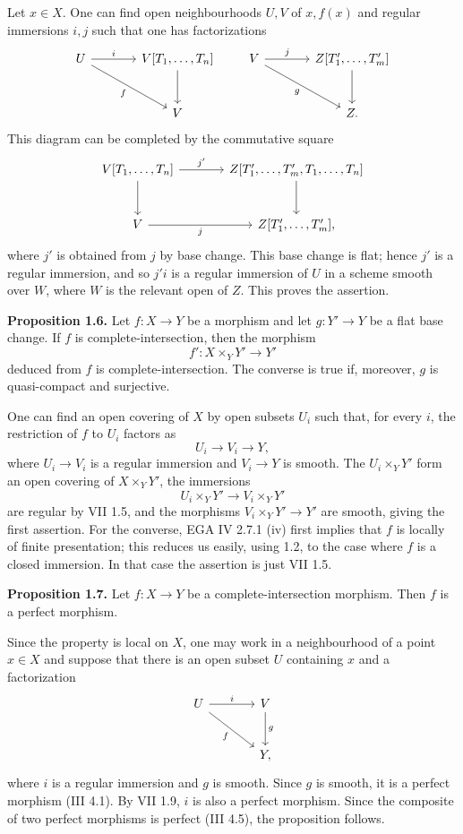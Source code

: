 \documentclass[11pt]{article}
\begin{document}
Let $x\in X$. One can find open neighbourhoods $U,V$ of $x,f(x)$ and regular immersions $i,j$ such that one has factorizations
\[
\begin{tikzcd}[column sep=large,row sep=large]
U \arrow[r,"i"] \arrow[dr,"f"'] & V[T_1,\ldots,T_n] \arrow[d]\\
& V
\end{tikzcd}
\qquad
\begin{tikzcd}[column sep=large,row sep=large]
V \arrow[r,"j"] \arrow[dr,"g"'] & Z[T'_1,\ldots,T'_m] \arrow[d]\\
& Z.
\end{tikzcd}
\]
This diagram can be completed by the commutative square
\[
\begin{tikzcd}[column sep=large,row sep=large]
V[T_1,\ldots,T_n] \arrow[r,"j'"] \arrow[d] & Z[T'_1,\ldots,T'_m,T_1,\ldots,T_n] \arrow[d]\\
V \arrow[r,"j"'] & Z[T'_1,\ldots,T'_m],
\end{tikzcd}
\]
where $j'$ is obtained from $j$ by base change. This base change is flat; hence $j'$ is a regular immersion, and so $j'i$ is a regular immersion of $U$ in a scheme smooth over $W$, where $W$ is the relevant open of $Z$. This proves the assertion.

\textbf{Proposition 1.6.} Let $f:X\to Y$ be a morphism and let $g:Y'\to Y$ be a flat base change. If $f$ is complete-intersection, then the morphism
\[
f':X\times_Y Y'\longrightarrow Y'
\]
deduced from $f$ is complete-intersection. The converse is true if, moreover, $g$ is quasi-compact and surjective.

One can find an open covering of $X$ by open subsets $U_i$ such that, for every $i$, the restriction of $f$ to $U_i$ factors as
\[
U_i\longrightarrow V_i\longrightarrow Y,
\]
where $U_i\to V_i$ is a regular immersion and $V_i\to Y$ is smooth. The $U_i\times_Y Y'$ form an open covering of $X\times_Y Y'$, the immersions
\[
U_i\times_Y Y'\longrightarrow V_i\times_Y Y'
\]
are regular by VII 1.5, and the morphisms $V_i\times_Y Y'\to Y'$ are smooth, giving the first assertion. For the converse, EGA IV 2.7.1 (iv) first implies that $f$ is locally of finite presentation; this reduces us easily, using 1.2, to the case where $f$ is a closed immersion. In that case the assertion is just VII 1.5.

\textbf{Proposition 1.7.} Let $f:X\to Y$ be a complete-intersection morphism. Then $f$ is a perfect morphism.

Since the property is local on $X$, one may work in a neighbourhood of a point $x\in X$ and suppose that there is an open subset $U$ containing $x$ and a factorization
\[
\begin{tikzcd}[column sep=large,row sep=large]
U \arrow[r,"i"] \arrow[dr,"f"'] & V \arrow[d,"g"]\\
& Y,
\end{tikzcd}
\]
where $i$ is a regular immersion and $g$ is smooth. Since $g$ is smooth, it is a perfect morphism (III 4.1). By VII 1.9, $i$ is also a perfect morphism. Since the composite of two perfect morphisms is perfect (III 4.5), the proposition follows.
\end{document}
